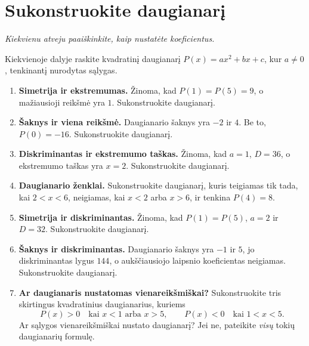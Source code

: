 \documentclass[11pt,a4paper]{article}
\newcommand{\uzd}[2]{\needspace{7\baselineskip}\section{#1}\textit{#2}\par\smallskip}
\begin{document}
\uzd{Sukonstruokite daugianarį}{Kiekvienu atveju paaiškinkite, kaip nustatėte koeficientus.}
Kiekvienoje dalyje raskite kvadratinį daugianarį
$P(x)=ax^2+bx+c$, kur $a\neq0$, tenkinantį nurodytas sąlygas.
\begin{enumerate}
\item \textbf{Simetrija ir ekstremumas.}
 Žinoma, kad $P(1)=P(5)=9$, o mažiausioji reikšmė yra $1$.
 Sukonstruokite daugianarį.
\item \textbf{Šaknys ir viena reikšmė.}
 Daugianario šaknys yra $-2$ ir $4$. Be to, $P(0)=-16$.
 Sukonstruokite daugianarį.
\item \textbf{Diskriminantas ir ekstremumo taškas.}
 Žinoma, kad $a=1$, $D=36$, o ekstremumo taškas yra $x=2$.
 Sukonstruokite daugianarį.
\item \textbf{Daugianario ženklai.}
 Sukonstruokite daugianarį, kuris teigiamas tik tada, kai $2<x<6$,
 neigiamas, kai $x<2$ arba $x>6$, ir tenkina $P(4)=8$.
\item \textbf{Simetrija ir diskriminantas.}
 Žinoma, kad $P(1)=P(5)$, $a=2$ ir $D=32$.
 Sukonstruokite daugianarį.
\item \textbf{Šaknys ir diskriminantas.}
 Daugianario šaknys yra $-1$ ir $5$, jo diskriminantas lygus $144$,
 o aukščiausiojo laipsnio koeficientas neigiamas.
 Sukonstruokite daugianarį.
\item \textbf{Ar daugianaris nustatomas vienareikšmiškai?}
 Sukonstruokite tris skirtingus kvadratinius daugianarius, kuriems
\[
P(x)>0\quad\text{kai }x<1\text{ arba }x>5,\qquad
P(x)<0\quad\text{kai }1<x<5.
\]
Ar sąlygos vienareikšmiškai nustato daugianarį? Jei ne, pateikite
 \emph{visų} tokių daugianarių formulę.
\end{enumerate}
\end{document}
